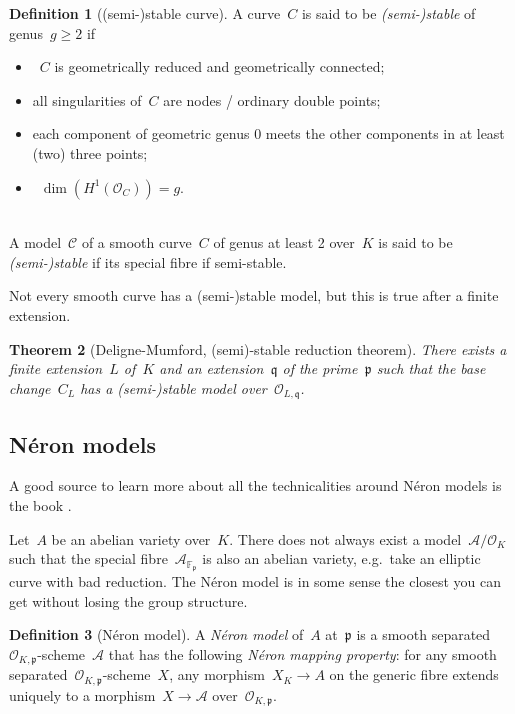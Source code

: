 \documentclass[12pt]{article}
\newtheorem{theorem}{Theorem}[section]
\theoremstyle{definition}
\newtheorem{definition}[theorem]{Definition}
\numberwithin{equation}{subsection}
\begin{document}
\begin{definition}[(semi-)stable curve]
A curve~$C$ is said to be {\em (semi-)stable} of genus~$g \geq 2$ if\\[-0.7cm]
\begin{itemize}\itemsep0pt
\item~$C$ is geometrically reduced and geometrically connected;
\item all singularities of~$C$ are nodes / ordinary double points;
\item each component of geometric genus 0 meets the other components in at least (two) three points;
\item~$\dim(H^1(\mathcal{O}_C)) = g$.
\end{itemize}\mbox{}\\[-0.7cm]
A model~$\mathcal{C}$ of a smooth curve~$C$ of genus at least 2 over~$K$ is said to be {\em (semi-)stable} if its special fibre if semi-stable.
\end{definition}

Not every smooth curve has a (semi-)stable model, but this is true after a finite extension.

\begin{theorem}[Deligne-Mumford, (semi)-stable reduction theorem]
There exists a finite extension~$L$ of~$K$ and an extension~$\mathfrak{q}$ of the prime~$\mathfrak{p}$ such that the base change~$C_L$ has a (semi-)stable model over~$\mathcal{O}_{L,\mathfrak{q}}$. 
\end{theorem}

\subsection{\texorpdfstring{N\'eron models}{Néron models}}

A good source to learn more about all the technicalities around N\'eron models is the book \cite{BLR}.

Let~$A$ be an abelian variety over~$K$. There does not always exist a model~$\mathcal{A}/\mathcal{O}_K$ such that the special fibre~$\mathcal{A}_{\mathbb{F}_\mathfrak{p}}$ is also an abelian variety, e.g.\ take an elliptic curve with bad reduction. The N\'eron model is in some sense the closest you can get without losing the group structure.

\begin{definition}[N\'eron model]
A {\em N\'eron model} of~$A$ at~$\mathfrak{p}$ is a smooth separated~$\mathcal{O}_{K,\mathfrak{p}}$-scheme~$\mathcal{A}$ that has the following {\em N\'eron mapping property}: for any smooth separated~$\mathcal{O}_{K,\mathfrak{p}}$-scheme~$X$, any morphism~$X_K \to A$ on the generic fibre extends uniquely to a morphism~$X \to \mathcal{A}$ over~$\mathcal{O}_{K, \mathfrak{p}}$.
\end{definition}
\end{document}
